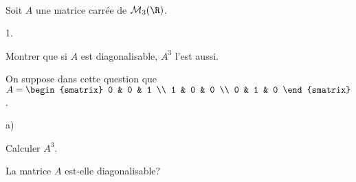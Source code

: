 \documentclass[11pt]{article}%
\begin{document}

\begin{exerciceSP}~\\
  Soit $A$ une matrice carrée de $\mathcal{M}_3 ( \R ) $.
  \begin{noliste}{1.}
    \setlength{\itemsep}{2mm}
  \item Montrer que si $A$ est diagonalisable, $A^3$ l'est aussi.
  \item On suppose dans cette question que $A = 
    \begin{smatrix} 
      0 & 0 & 1 \\ 
      1 & 0 & 0 \\ 
      0 & 1 & 0 
    \end{smatrix}$. 
    \begin{noliste}{a)}
    \setlength{\itemsep}{2mm}
    \item Calculer $A^3$.
    \item La matrice $A$ est-elle diagonalisable?
    \end{noliste}
  \end{noliste}
\end{exerciceSP}




\end{document}
